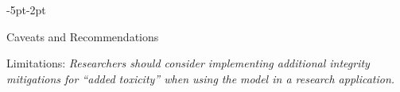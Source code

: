 \begin{adjustwidth}{-5pt}{-2pt}
\begin{singlespace}
\begin{tcolorbox}[title=\textbf{\section{Model Card - \seamlessstreaming}},
    breakable, sharp corners, boxrule=0.5pt]
\begin{mcsection}{Caveats and Recommendations}
  \item Limitations: \textit{Researchers should consider implementing additional integrity mitigations for ``added toxicity'' when using the model in a research application.}
\end{mcsection}


\end{tcolorbox}
\end{singlespace}
\end{adjustwidth}

